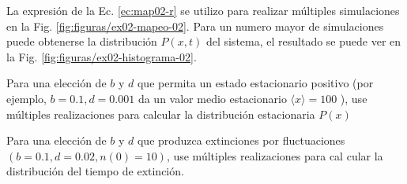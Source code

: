 \documentclass[twocolumn,aps,prl]{revtex4-1}
\begin{document}
La expresión de la Ec. \ref{ec:map02-r} se utilizo para realizar múltiples simulaciones en la Fig. \ref{fig:figuras/ex02-mapeo-02}. Para un numero mayor de simulaciones puede obtenerse la distribución $P(x,t)$ del sistema, el resultado se puede ver en la Fig. \ref{fig:figuras/ex02-histograma-02}.


Para una elección de $b$ y $d$ que permita un estado estacionario positivo (por ejemplo, $b=0.1, d=0.001$ da un valor medio estacionario $\langle x\rangle=100$ ), use múltiples realizaciones para calcular la distribución estacionaria $P(x)$

Para una elección de $b$ y $d$ que produzca extinciones por fluctuaciones $(b=0.1, d=0.02, n(0)=10)$, use múltiples realizaciones para cal cular la distribución del tiempo de extinción.
\end{document}
